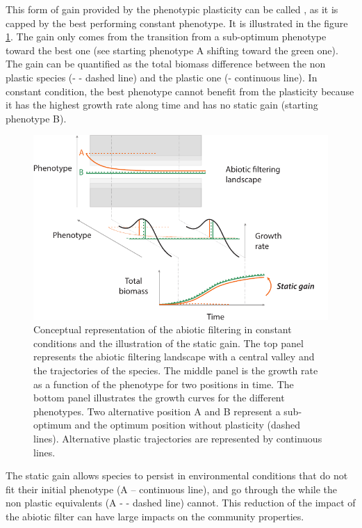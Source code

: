 This form of gain provided by the phenotypic plasticity can be called , as it is capped by the best performing constant phenotype. It is illustrated in the figure \ref{fig:filter}. The gain only comes from the transition from a sub-optimum phenotype toward the best one (see  \textcolor{myOrange}{starting phenotype A}  shifting toward the green one). The gain can be quantified as the total biomass difference between the non plastic species (- - dashed line) and the plastic one (- continuous line).  In constant condition, the best phenotype cannot benefit from the plasticity because it has the highest growth rate along time and has no static gain (\textcolor{myGreen}{starting phenotype B}). 


\begin{figure}\label{fig:filter}
\includegraphics[width = \textwidth]{./2_PP/Figures/Rain/filtering.pdf}
\caption[Abiotic filtering in constant conditions]{Conceptual representation of the abiotic filtering in constant conditions and the illustration of the static gain. The top panel represents the abiotic filtering landscape with a central valley and the trajectories of the species. The middle panel is the growth rate as a function of the phenotype for two positions in time. The bottom panel illustrates the growth curves for the different phenotypes. Two alternative position \textcolor{myOrange}{A} and \textcolor{myGreen}{B} represent a sub-optimum and the optimum position without plasticity (dashed lines). Alternative plastic trajectories are represented by continuous lines. }
\end{figure}

The static gain allows species to persist in environmental conditions that do not fit their initial phenotype (\textcolor{myOrange}{A -- continuous line}), and go through the  while the non plastic equivalents (\textcolor{myOrange}{A - - dashed line}) cannot. This reduction of the impact of the abiotic filter can have large impacts on the community properties.

